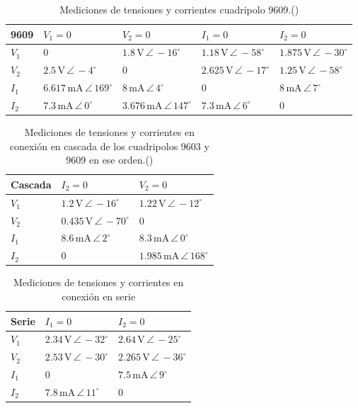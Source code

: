 \begin{table}[H]
\centering
\begin{tabular}{|l|l|l|l|l|}
\hline
\textbf{9609} & $V_1=0$ & $V_2=0$ & $I_1=0$ & $I_2=0$ \\ \hline
$V_1$ & $0$ & $1.8\,\mathrm{V}\,\angle\,-16^\circ$ & $1.18\,\mathrm{V}\,\angle\,-58^\circ$ & $1.875\,\mathrm{V}\,\angle\,-30^\circ$ \\ \hline
$V_2$ & $2.5\,\mathrm{V}\,\angle\,-4^\circ$ & $0$ & $2.625\,\mathrm{V}\,\angle\,-17^\circ$ & $1.25\,\mathrm{V}\,\angle\,-58^\circ$ \\ \hline
$I_1$ & $6.617\,\mathrm{mA}\,\angle\,169^\circ$ & $8\,\mathrm{mA}\,\angle\,4^\circ$ & $0$ & $8\,\mathrm{mA}\,\angle\,7^\circ$ \\ \hline
$I_2$ & $7.3\,\mathrm{mA}\,\angle\,0^\circ$ & $3.676\,\mathrm{mA}\,\angle\,147^\circ$ & $7.3\,\mathrm{mA}\,\angle\,6^\circ$ & $0$ \\ \hline
\end{tabular}
\caption{Mediciones de tensiones y corrientes cuadripolo 9609.()}
\label{tab:mediciones9609}
\end{table}

\begin{table}[H]
\centering
\begin{tabular}{|l|l|l|}
\hline
\textbf{Cascada} & $I_2 = 0$ & $V_2 = 0$ \\ \hline
$V_1$ & $1.2\,\mathrm{V}\,\angle\,-16^\circ$ & $1.22\,\mathrm{V}\,\angle\,-12^\circ$ \\ \hline
$V_2$ & $0.435\,\mathrm{V}\,\angle\,-70^\circ$ & $0$ \\ \hline
$I_1$ & $8.6\,\mathrm{mA}\,\angle\,2^\circ$ & $8.3\,\mathrm{mA}\,\angle\,0^\circ$ \\ \hline
$I_2$ & $0$ & $1.985\,\mathrm{mA}\,\angle\,168^\circ$ \\ \hline
\end{tabular}
\caption{Mediciones de tensiones y corrientes en conexión en cascada de los cuadripolos 9603 y 9609 en ese orden.()}
\label{tab:corrientes_tensiones_cascada}
\end{table}

\begin{table}[H]
\centering
\begin{tabular}{|l|l|l|}
\hline
\textbf{Serie} & $I_1 = 0$ & $I_2 = 0$ \\ \hline
$V_1$ & $2.34\,\mathrm{V}\,\angle\,-32^\circ$ & $2.64\,\mathrm{V}\,\angle\,-25^\circ$ \\ \hline
$V_2$ & $2.53\,\mathrm{V}\,\angle\,-30^\circ$ & $2.265\,\mathrm{V}\,\angle\,-36^\circ$ \\ \hline
$I_1$ & $0$ & $7.5\,\mathrm{mA}\,\angle\,9^\circ$ \\ \hline
$I_2$ & $7.8\,\mathrm{mA}\,\angle\,11^\circ$ & $0$ \\ \hline
\end{tabular}
\caption{Mediciones de tensiones y corrientes en conexión en serie}
\label{tab:corrientes_tensiones_serie}
\end{table}

